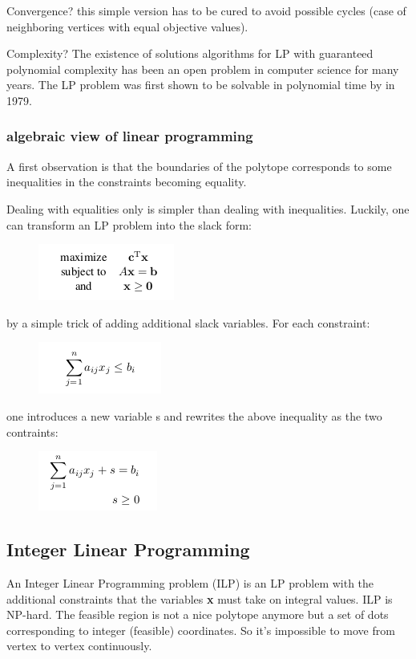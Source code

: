 \documentclass[10pt]{article}
\begin{document}
Convergence? this simple version has to be cured to avoid possible cycles (case of neighboring vertices with equal objective values). 

Complexity? The existence of solutions algorithms for LP with guaranteed polynomial complexity has been an open problem in computer science for many years. The LP problem was first shown to be solvable in polynomial time by in 1979.

\subsubsection{algebraic view of linear programming}
A first observation is that the boundaries of the polytope corresponds to some inequalities in the constraints becoming equality. 

Dealing with equalities only is simpler than dealing with inequalities. Luckily, one can transform an LP problem into the slack form:

\begin{figure}[H]
\includegraphics[scale=0.60]{alp}
\centering
\end{figure}

by a simple trick of adding additional slack variables. For each constraint:

\begin{figure}[H]
\includegraphics[scale=0.60]{slack}
\centering
\end{figure}

one introduces a new variable s and rewrites the above inequality as the two contraints:

\begin{figure}[H]
\includegraphics[scale=0.60]{ineq}
\centering
\end{figure}

\subsection{Integer Linear Programming} 
An Integer Linear Programming problem (ILP) is an LP problem with the additional constraints that the variables \textbf{x} must take on integral values. ILP is NP-hard. The feasible region is not a nice  polytope anymore but a set of dots corresponding to integer (feasible)
coordinates. So it's impossible to move from vertex to vertex continuously.
\end{document}
